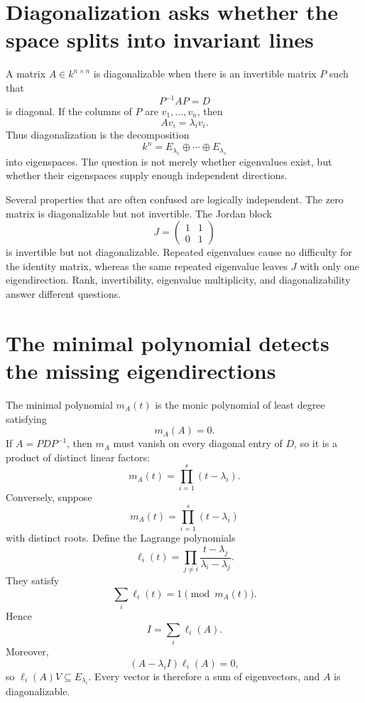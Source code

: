 
\section{Diagonalization asks whether the space splits into invariant lines}

A matrix \(A\in k^{n\times n}\) is diagonalizable when there is an invertible matrix \(P\) such that
\[
  P^{-1}AP=D
\]
is diagonal.  If the columns of \(P\) are \(v_1,\ldots,v_n\), then
\[
  Av_i=\lambda_i v_i.
\]
Thus diagonalization is the decomposition
\[
  k^n=E_{\lambda_1}\oplus\cdots\oplus E_{\lambda_s}
\]
into eigenspaces.  The question is not merely whether eigenvalues exist, but whether their eigenspaces supply enough independent directions.

Several properties that are often confused are logically independent.  The zero matrix is diagonalizable but not invertible.  The Jordan block
\[
  J=
  \begin{pmatrix}
    1&1\\
    0&1
  \end{pmatrix}
\]
is invertible but not diagonalizable.  Repeated eigenvalues cause no difficulty for the identity matrix, whereas the same repeated eigenvalue leaves \(J\) with only one eigendirection.  Rank, invertibility, eigenvalue multiplicity, and diagonalizability answer different questions.

\section{The minimal polynomial detects the missing eigendirections}

The minimal polynomial \(m_A(t)\) is the monic polynomial of least degree satisfying
\[
  m_A(A)=0.
\]
If \(A=PDP^{-1}\), then \(m_A\) must vanish on every diagonal entry of \(D\), so it is a product of distinct linear factors:
\[
  m_A(t)=\prod_{i=1}^s(t-\lambda_i).
\]
Conversely, suppose
\[
  m_A(t)=\prod_{i=1}^s(t-\lambda_i)
\]
with distinct roots.  Define the Lagrange polynomials
\[
  \ell_i(t)
  =\prod_{j\ne i}
  \frac{t-\lambda_j}{\lambda_i-\lambda_j}.
\]
They satisfy
\[
  \sum_i\ell_i(t)=1
  \pmod{m_A(t)}.
\]
Hence
\[
  I=\sum_i\ell_i(A).
\]
Moreover,
\[
  (A-\lambda_iI)\ell_i(A)=0,
\]
so \(\ell_i(A)V\subseteq E_{\lambda_i}\).  Every vector is therefore a sum of eigenvectors, and \(A\) is diagonalizable.

